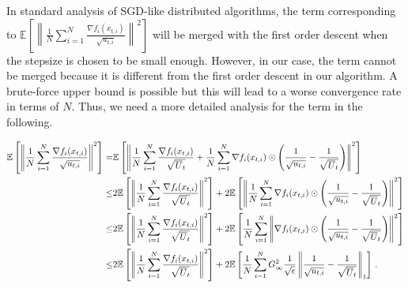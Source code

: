\documentclass[11pt]{article}
\begin{document}
\noindent In standard analysis of SGD-like distributed algorithms, the term corresponding to $ \mathbb E \left[  \left\| \frac{1}{N} \sum_{i=1}^N \frac{\nabla f_i(x_{t,i})}{\sqrt{u_{t,i}}} \right\|^2     \right] $ will be merged with the first order descent when the stepsize is chosen to be small enough. However, in our case, the term cannot be merged because it is different from the first order descent in our algorithm. A brute-force upper bound is possible but this will lead to a worse convergence rate in terms of $N$. Thus, we need a more detailed analysis for the term in the following.

\newpage

\begin{align}\notag
\mathbb E \left[  \left\| \frac{1}{N} \sum_{i=1}^N \frac{\nabla f_i(x_{t,i})}{\sqrt{u_{t,i}}} \right\|^2     \right]  
=& \mathbb E \left[  \left\|\frac{1}{N} \sum_{i=1}^N \frac{\nabla f_i(x_{t,i})}{\sqrt{\overline U_t}  } +   \frac{1}{N} \sum_{i=1}^N \nabla f_i(x_{t,i}) \odot \left( \frac{1}{\sqrt{u_{t,i}}} - \frac{1}{\sqrt{\overline U_{t}}} \right) \right\|^2     \right] \nonumber  \\
\leq & 2 \mathbb E \left[  \left\|\frac{1}{N} \sum_{i=1}^N \frac{\nabla f_i(x_{t,i})}{\sqrt{\overline U_t}  } \right\|^2 \right] + 2\mathbb E \left[ \left\|  \frac{1}{N} \sum_{i=1}^N \nabla f_i(x_{t,i}) \odot \left( \frac{1}{\sqrt{u_{t,i}}} - \frac{1}{\sqrt{\overline U_{t}}} \right) \right\|^2     \right] \nonumber \\
\leq & 2 \mathbb E \left[  \left\|\frac{1}{N} \sum_{i=1}^N \frac{\nabla f_i(x_{t,i})}{\sqrt{\overline U_t}  } \right\|^2 \right] + 2\mathbb E \left[  \frac{1}{N} \sum_{i=1}^N \left\|    \nabla f_i(x_{t,i}) \odot \left( \frac{1}{\sqrt{u_{t,i}}} - \frac{1}{\sqrt{\overline U_{t}}} \right) \right\|^2     \right] \nonumber \\
\leq & 2 \mathbb E \left[  \left\|\frac{1}{N} \sum_{i=1}^N \frac{\nabla f_i(x_{t,i})}{\sqrt{\overline U_t}  } \right\|^2 \right] + 2\mathbb E \left[  \frac{1}{N} \sum_{i=1}^N G_{\infty}^2  \frac{1}{\sqrt{\epsilon}}\left\|     \frac{1}{\sqrt{u_{t,i}}} - \frac{1}{\sqrt{\overline U_{t}}}  \right\|_1     \right] \, .\nonumber
\end{align}
\end{document}
